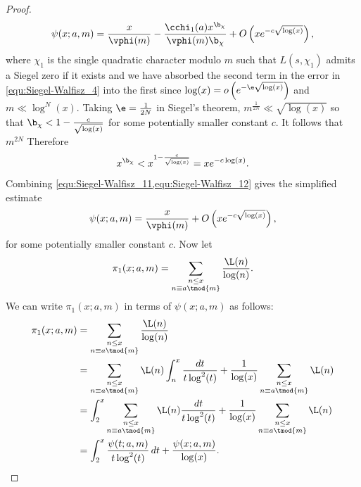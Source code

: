 \begin{proof}
      \begin{equation}\label{equ:Siegel-Walfisz_11}
        \psi(x;a,m) = \frac{x}{\vphi(m)}-\frac{\cchi_{1}(a)x^{\b_{\chi}}}{\vphi(m)\b_{\chi}}+O\left(xe^{-c\sqrt{\log(x)}}\right),
      \end{equation}
      where \(\chi_{1}\) is the single quadratic character modulo \(m\) such that \(L(s,\chi_{1})\) admits a Siegel zero if it exists and we have absorbed the second term in the error in \cref{equ:Siegel-Walfisz_4} into the first since \(\log(x) = o\left(e^{-\e\sqrt{\log(x)}}\right)\) and \(m \ll \log^{N}(x)\). Taking \(\e = \frac{1}{2N}\) in Siegel's theorem, \(m^\frac{1}{2N} \ll \sqrt{\log(x)}\) so that \(\b_{\chi} < 1-\frac{c}{\sqrt{\log(x)}}\) for some potentially smaller constant \(c\). It follows that \(m^{2N}\) Therefore
      \begin{equation}\label{equ:Siegel-Walfisz_12}
        x^{\b_{\chi}} < x^{1-\frac{c}{\sqrt{\log(x)}}} = xe^{-c\log(x)}.
      \end{equation}
      Combining \cref{equ:Siegel-Walfisz_11,equ:Siegel-Walfisz_12} gives the simplified estimate
      \begin{equation}\label{equ:Siegel-Walfisz_13}
        \psi(x;a,m) = \frac{x}{\vphi(m)}+O\left(xe^{-c\sqrt{\log(x)}}\right),
      \end{equation}
      for some potentially smaller constant \(c\). Now let
      \[
        \pi_{1}(x;a,m) = \sum_{\substack{n \le x \\ n \equiv a \tmod{m}}}\frac{\L(n)}{\log(n)}.
      \]
      We can write \(\pi_{1}(x;a,m)\) in terms of \(\psi(x;a,m)\) as follows:
      \begin{align*}
        \pi_{1}(x;a,m) &= \sum_{\substack{n \le x \\ n \equiv a \tmod{m}}}\frac{\L(n)}{\log(n)} \\
        &= \sum_{\substack{n \le x \\ n \equiv a \tmod{m}}}\L(n)\int_{n}^{x}\frac{dt}{t\log^{2}(t)}+\frac{1}{\log(x)}\sum_{\substack{n \le x \\ n \equiv a \tmod{m}}}\L(n) \\
        &= \int_{2}^{x}\sum_{\substack{n \le x \\ n \equiv a \tmod{m}}}\L(n)\frac{dt}{t\log^{2}(t)}+\frac{1}{\log(x)}\sum_{\substack{n \le x \\ n \equiv a \tmod{m}}}\L(n) \\
        &= \int_{2}^{x}\frac{\psi(t;a,m)}{t\log^{2}(t)}\,dt+\frac{\psi(x;a,m)}{\log(x)}.
      \end{align*}

\end{proof}
